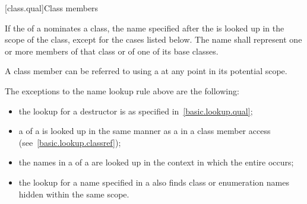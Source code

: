 [class.qual]{Class members}

\pnum
{}%
If the  of a 
nominates a class, the name specified after the
 is looked up in the scope of the
class, except for the cases listed below.
The name shall represent one or more members of that class or of one of
its base classes. \begin{note} A class member
can be referred to using a  at any point in its
potential scope. \end{note} The exceptions to
the name lookup rule above are the following:
\begin{itemize}
\item the lookup for a destructor is as specified
in~\ref{basic.lookup.qual};

\item a  of a
 is looked up
in the same manner as a  in a class member
access (see~\ref{basic.lookup.classref});

\item the names in a  of a
 are looked up in the context in which the entire
 occurs;

\item the lookup for a name specified in a
 also finds class or
enumeration names hidden within the same
scope.
\end{itemize}

